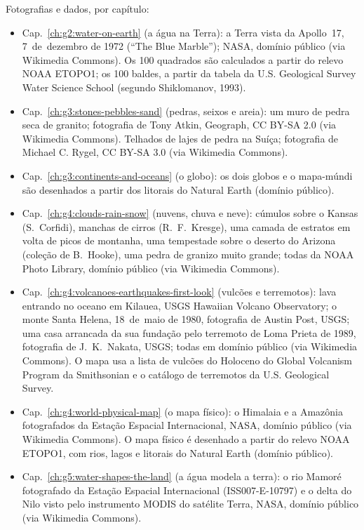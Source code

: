 \bigskip
\noindent Fotografias e dados, por capítulo:
\begin{itemize}\small
  \item Cap.~\ref{ch:g2:water-on-earth} (a água na Terra): a Terra vista da Apollo~17, 7~de~dezembro de 1972 (``The Blue Marble''); NASA, domínio público (via Wikimedia Commons). Os 100 quadrados são calculados a partir do relevo NOAA ETOPO1; os 100 baldes, a partir da tabela da U.S. Geological Survey Water Science School (segundo Shiklomanov, 1993).
  \item Cap.~\ref{ch:g3:stones-pebbles-sand} (pedras, seixos e areia): um muro de pedra seca de granito; fotografia de Tony Atkin, Geograph, CC BY-SA 2.0 (via Wikimedia Commons). Telhados de lajes de pedra na Suíça; fotografia de Michael C. Rygel, CC BY-SA 3.0 (via Wikimedia Commons).
  \item Cap.~\ref{ch:g3:continents-and-oceans} (o globo): os dois globos e o mapa-múndi são desenhados a partir dos litorais do Natural Earth (domínio público).
  \item Cap.~\ref{ch:g4:clouds-rain-snow} (nuvens, chuva e neve): cúmulos sobre o Kansas (S.~Corfidi), manchas de cirros (R.~F.~Kresge), uma camada de estratos em volta de picos de montanha, uma tempestade sobre o deserto do Arizona (coleção de B.~Hooke), uma pedra de granizo muito grande; todas da NOAA Photo Library, domínio público (via Wikimedia Commons).
  \item Cap.~\ref{ch:g4:volcanoes-earthquakes-first-look} (vulcões e terremotos): lava entrando no oceano em Kilauea, USGS Hawaiian Volcano Observatory; o monte Santa Helena, 18~de~maio de 1980, fotografia de Austin Post, USGS; uma casa arrancada da sua fundação pelo terremoto de Loma Prieta de 1989, fotografia de J.~K.~Nakata, USGS; todas em domínio público (via Wikimedia Commons). O mapa usa a lista de vulcões do Holoceno do Global Volcanism Program da Smithsonian e o catálogo de terremotos da U.S. Geological Survey.
  \item Cap.~\ref{ch:g4:world-physical-map} (o mapa físico): o Himalaia e a Amazônia fotografados da Estação Espacial Internacional, NASA, domínio público (via Wikimedia Commons). O mapa físico é desenhado a partir do relevo NOAA ETOPO1, com rios, lagos e litorais do Natural Earth (domínio público).
  \item Cap.~\ref{ch:g5:water-shapes-the-land} (a água modela a terra): o rio Mamoré fotografado da Estação Espacial Internacional (ISS007-E-10797) e o delta do Nilo visto pelo instrumento MODIS do satélite Terra, NASA, domínio público (via Wikimedia Commons).

\end{itemize}
